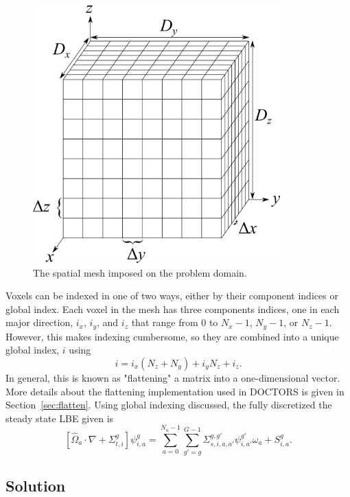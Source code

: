 \begin{figure}[tb]
  \begin{center}
   \includegraphics[width=3.75in]{figs/spatial_disc}
  \end{center}
  \caption{The spatial mesh imposed on the problem domain.}
\label{fig:spatial_disc}
\end{figure}

Voxels can be indexed in one of two ways, either by their component indices or global index. Each voxel in the mesh has three components indices, one in each major direction, $i_x$, $i_y$, and $i_z$ that range from 0 to $N_x - 1$, $N_y - 1$, or $N_z-1$. However, this makes indexing cumbersome, so they are combined into a unique global index, $i$ using 
\begin{equation} \label{eq:indx_flat}
i = i_x (N_z + N_y) + i_y N_z + i_z.
\end{equation}
In general, this is known as "flattening" a matrix into a one-dimensional vector. More details about the flattening implementation used in DOCTORS is given in Section~\ref{sec:flatten}. Using global indexing discussed, the fully discretized the steady state LBE given is
\begin{equation} \label{eq:boltz_i}
\left[ \hat{\Omega}_a \cdot \nabla + \Sigma_{t,i}^g \right]
\psi_{i,a}^{g} = 
\sum_{a=0}^{N_a-1} \sum_{g'=g}^{G-1} \Sigma_{s, i, a, a'}^{g, g'} \psi_{i, a'}^{g'} \omega_a + S_{i,a}^g.
\end{equation}

\subsection{Solution}

